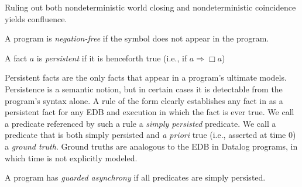 
Ruling out both nondeterministic world closing and nondeterministic coincidence yields confluence.


\begin{definition}
A \lang program is {\em negation-free} if the \dedalus{!} symbol does not appear in the program.
\end{definition}

\begin{definition}

A fact $a$ is  {\em persistent} if it is henceforth true 
(i.e., if $a \Rightarrow \Box a$)
\end{definition}

Persistent facts are the only facts that appear in a program's ultimate models.
Persistence is a semantic notion, but in certain cases it is detectable from the program's 
syntax alone.  A rule of the form  clearly establishes any fact
in  as a persistent fact for any EDB and execution in which the fact
is ever true. 
We call a predicate referenced by such a rule
a {\em simply persisted} predicate.  
We call a predicate that is both simply persisted and  {\em a priori} true (i.e., asserted
at time 0) a {\em ground truth}.  Ground truths are analogous to the EDB in Datalog programs,
in which time is not explicitly modeled.


\begin{definition}
A \lang program has {\em guarded asynchrony} if all  predicates are simply persisted.
\end{definition}

